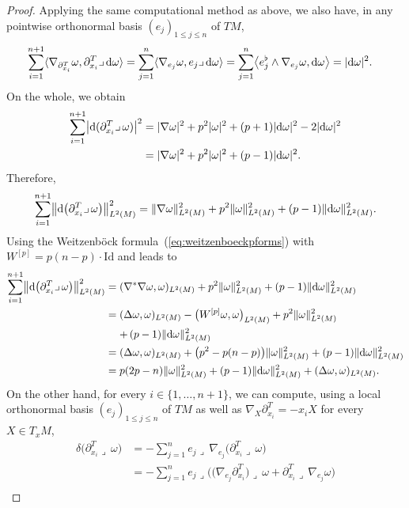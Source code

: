 \documentclass[10pt,a4paper]{amsart}
\numberwithin{equation}{section}
\theoremstyle{definition}
\begin{document}
\begin{proof}
Applying the same computational method as above, we also have, in any pointwise or\-tho\-nor\-mal basis $(e_j)_{1\leq j\leq n}$ of $TM$,
\begin{align*}
\sum_{i=1}^{n+1}\langle \nabla_{\partial_{x_i}^T}\omega,\partial_{x_i}^T\lrcorner\,{\rm d}\omega\rangle&=\sum_{j=1}^n\langle \nabla_{e_j}\omega,e_j\lrcorner\,{\rm d}\omega\rangle
=\sum_{j=1}^n\bigl\langle e_j^\flat\wedge\nabla_{e_j}\omega,{\rm d}\omega\bigr\rangle
=|{\rm d}\omega|^2.
\end{align*}
On the whole, we obtain
\begin{align*}
\sum_{i=1}^{n+1}\bigl|{\rm d}(\partial_{x_i}^T\lrcorner\,\omega)\bigr|^2&=|\nabla\omega|^2+p^2|\omega|^2+(p+1)|{\rm d}\omega|^2-2|{\rm d}\omega|^2\\
&=|\nabla\omega|^2+p^2|\omega|^2+(p-1)|{\rm d}\omega|^2.
\end{align*}
Therefore,
\[
\sum_{i=1}^{n+1}\bigl\|{\rm d}\bigl(\partial_{x_i}^T\lrcorner\,\omega\bigr)\bigr\|_{L^2(M)}^2= \|\nabla\omega\|_{L^2(M)}^2+p^2\|\omega\|_{L^2(M)}^2+(p-1)\|{\rm d} \omega\|_{L^2(M)}^2.
\]
Using the Weitzenb\"ock formula~(\ref{eq:weitzenboeckpforms}) with $W^{[p]}=p(n-p)\cdot\mathrm{Id}$ and 
leads to
\begin{align*}
\sum_{i=1}^{n+1}\bigl\|{\rm d}\bigl(\partial_{x_i}^T\lrcorner\,\omega\bigr)\bigr\|_{L^2(M)}^2={}&(\nabla^*\nabla\omega,\omega)_{L^2(M)} +p^2\|\omega\|_{L^2(M)}^2+(p-1)\|{\rm d}\omega\|_{L^2(M)}^2\\
={}&(\Delta\omega,\omega)_{L^2(M)}-\bigl(W^{[p]}\omega,\omega\bigr)_{L^2(M)}+p^2\|\omega\|_{L^2(M)}^2\\
&{}{+}\,(p-1)\|{\rm d}\omega\|_{L^2(M)}^2\\
={}&(\Delta\omega,\omega)_{L^2(M)}+\bigl(p^2-p(n-p)\bigr)\|\omega\|_{L^2(M)}^2+(p-1)\|{\rm d}\omega\|_{L^2(M)}^2\\
={}&p(2p-n)\|\omega\|_{L^2(M)}^2+(p-1)\|{\rm d}\omega\|_{L^2(M)}^2+(\Delta\omega,\omega)_{L^2(M)}.
\end{align*}
On the other hand, for every $i\in\{1,\dots,n+1\}$, we can compute, using a local or\-tho\-nor\-mal basis $(e_j)_{1\leq j\leq n}$ of $TM$ as well as $\nabla_X\partial_{x_i}^T=-x_i X$ for every $X\in T_xM$,
\begin{align*}
\delta\bigl(\partial_{x_i}^T\lrcorner\,\omega\bigr)&=-\sum_{j=1}^ne_j\lrcorner\,\nabla_{e_j}\bigl(\partial_{x_i}^T\lrcorner\,\omega\bigr)\\
&=-\sum_{j=1}^ne_j\lrcorner\bigl(\bigl(\nabla_{e_j}\partial_{x_i}^T\bigr)\lrcorner\,\omega+\partial_{x_i}^T\lrcorner\,\nabla_{e_j}\omega\bigr)\\

\end{align*}
\end{proof}
\end{document}
